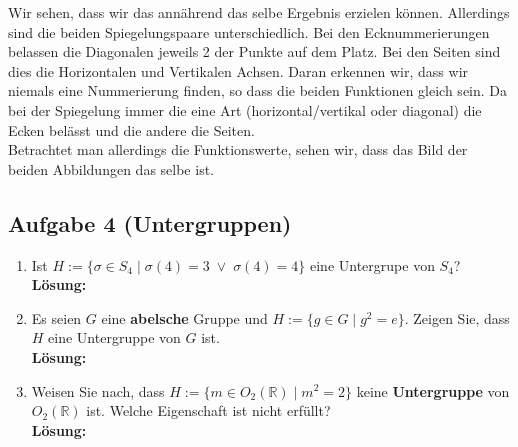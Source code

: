 \documentclass[11pt,a4paper,ngerman]{article}
\newcommand{\R}{\mathbb{R}}
\begin{document}
\begin{enumerate}[\bfseries a)]
Wir sehen, dass wir das annährend das selbe Ergebnis erzielen können. Allerdings sind die beiden Spiegelungspaare unterschiedlich. Bei den Ecknummerierungen belassen die Diagonalen jeweils 2 der Punkte auf dem Platz. Bei den Seiten sind dies die Horizontalen und Vertikalen Achsen. Daran erkennen wir, dass wir niemals eine Nummerierung finden, so dass die beiden Funktionen gleich sein. Da bei der Spiegelung immer die eine Art (horizontal/vertikal oder diagonal) die Ecken belässt und die andere die Seiten.\\

Betrachtet man allerdings die Funktionswerte, sehen wir, dass das Bild der beiden Abbildungen das selbe ist.
\end{enumerate}

\subsection*{Aufgabe 4 \mdseries (Untergruppen)}

\begin{enumerate}[\bfseries a)]

\item Ist $H := \{ \sigma \in S_4 \; | \; \sigma (4) = 3  \; \lor \; \sigma (4) = 4 \}$ eine Untergrupe von $S_4$?\\

\textbf{Lösung:}\\

\item Es seien $G$ eine \textbf{abelsche} Gruppe und $H := \{ g \in G \; | \; g^2 = e \}$. Zeigen Sie, dass $H$ eine Untergruppe von $G$ ist.\\

\textbf{Lösung:}\\

\item Weisen Sie nach, dass $H := \{ m \in O_2 (\R ) \; | \; m^2 = 2 \}$ keine \textbf{Untergruppe} von $O_2 (\R ) $ ist. Welche Eigenschaft ist nicht erfüllt?\\

\textbf{Lösung:}

\end{enumerate}

\label{LastPage}
\end{document}
